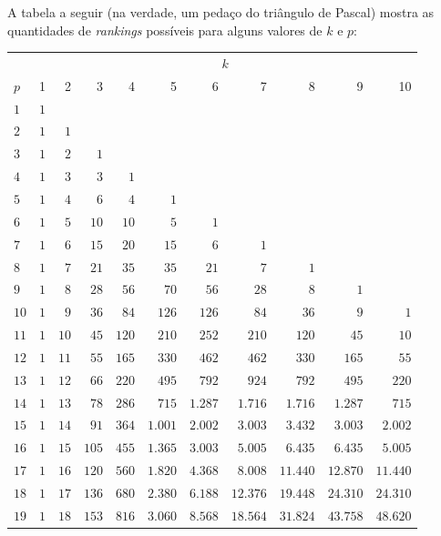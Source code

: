 \documentclass[
  letterpaper,
  DIV=11,
  numbers=noendperiod]{scrreprt}
\begin{document}
A tabela a seguir (na verdade, um pedaço do triângulo de Pascal) mostra
as quantidades de \emph{rankings} possíveis para alguns valores de $k$ e
$p$:

\begin{longtable*}{l|rrrrrrrrrr}
\toprule
{} &  \\ 
\cmidrule(lr){2-11}
 & 1 & 2 & 3 & 4 & 5 & 6 & 7 & 8 & 9 & 10 \\ 
\midrule\addlinespace[2.5pt]
$1$ & $1$ &  &  &  &  &  &  &  &  &  \\ 
$2$ & $1$ & $1$ &  &  &  &  &  &  &  &  \\ 
$3$ & $1$ & $2$ & $1$ &  &  &  &  &  &  &  \\ 
$4$ & $1$ & $3$ & $3$ & $1$ &  &  &  &  &  &  \\ 
$5$ & $1$ & $4$ & $6$ & $4$ & $1$ &  &  &  &  &  \\ 
$6$ & $1$ & $5$ & $10$ & $10$ & $5$ & $1$ &  &  &  &  \\ 
$7$ & $1$ & $6$ & $15$ & $20$ & $15$ & $6$ & $1$ &  &  &  \\ 
$8$ & $1$ & $7$ & $21$ & $35$ & $35$ & $21$ & $7$ & $1$ &  &  \\ 
$9$ & $1$ & $8$ & $28$ & $56$ & $70$ & $56$ & $28$ & $8$ & $1$ &  \\ 
$10$ & $1$ & $9$ & $36$ & $84$ & $126$ & $126$ & $84$ & $36$ & $9$ & $1$ \\ 
$11$ & $1$ & $10$ & $45$ & $120$ & $210$ & $252$ & $210$ & $120$ & $45$ & $10$ \\ 
$12$ & $1$ & $11$ & $55$ & $165$ & $330$ & $462$ & $462$ & $330$ & $165$ & $55$ \\ 
$13$ & $1$ & $12$ & $66$ & $220$ & $495$ & $792$ & $924$ & $792$ & $495$ & $220$ \\ 
$14$ & $1$ & $13$ & $78$ & $286$ & $715$ & $1.287$ & $1.716$ & $1.716$ & $1.287$ & $715$ \\ 
$15$ & $1$ & $14$ & $91$ & $364$ & $1.001$ & $2.002$ & $3.003$ & $3.432$ & $3.003$ & $2.002$ \\ 
$16$ & $1$ & $15$ & $105$ & $455$ & $1.365$ & $3.003$ & $5.005$ & $6.435$ & $6.435$ & $5.005$ \\ 
$17$ & $1$ & $16$ & $120$ & $560$ & $1.820$ & $4.368$ & $8.008$ & $11.440$ & $12.870$ & $11.440$ \\ 
$18$ & $1$ & $17$ & $136$ & $680$ & $2.380$ & $6.188$ & $12.376$ & $19.448$ & $24.310$ & $24.310$ \\ 
$19$ & $1$ & $18$ & $153$ & $816$ & $3.060$ & $8.568$ & $18.564$ & $31.824$ & $43.758$ & $48.620$ \\ 

\end{longtable*}
\end{document}
